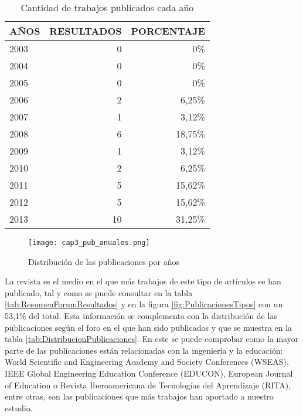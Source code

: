 \begin{table}[H]
  \begin{center}
  \begin{tabular}{| m{4cm} | r | r |}
    \hline
    AÑOS & RESULTADOS & PORCENTAJE\\
    \hline    
    \hline
    2003 & 0 & 0\% \\
    \hline
    2004 & 0 & 0\%\\
    \hline
    2005 & 0 & 0\%\\
    \hline
    2006 & 2 & 6,25\%\\
    \hline
    2007 & 1 & 3,12\%\\
    \hline
    2008 & 6 & 18,75\%\\
    \hline
    2009 & 1 & 3,12\%\\
    \hline
    2010 & 2 & 6,25\%\\
    \hline
    2011 & 5 & 15,62\%\\
    \hline
    2012 & 5 & 15,62\%\\
    \hline
    2013 & 10 & 31,25\% \\
    \hline
  \end{tabular}
\end{center}
\caption{Cantidad de trabajos publicados cada año}
\label{tab:ResumenAniosResultados}
\end{table} 

\begin{figure}[H]
  \begin{center}
    \texttt{[image: cap3\_pub\_anuales.png]}
  \end{center}
  \caption{Distribución de las publicaciones por años}
  \label{fig:PublicacionesAnuales}
\end{figure}

La revista es el medio en el que más trabajos de este tipo de artículos se han publicado, tal y como se puede consultar en la tabla \ref{tab:ResumenForumResultados} y en la figura \ref{fig:PublicacionesTipos} con un 53,1\% del total. Esta información se complementa con la distribución de las publicaciones según el foro en el que han sido publicados y que se muestra en la tabla \ref{tab:DistribucionPublicaciones}. En este se puede comprobar como la mayor parte de las publicaciones están relacionadas con la ingeniería y la educación: World Scientific and Engineering Academy and Society Conferences (WSEAS), IEEE Global Engineering Education Conference (EDUCON), European Journal of Education o Revista Iberoamericana de Tecnologías del Aprendizaje (RITA), entre otras, son las publicaciones que más trabajos han aportado a nuestro estudio.

